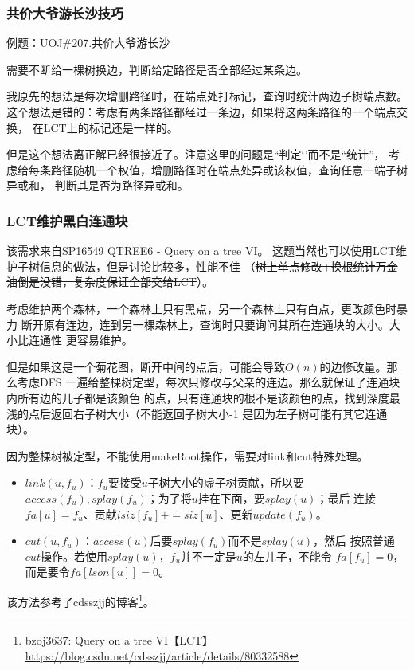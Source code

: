 \subsubsection{共价大爷游长沙技巧}
例题：UOJ\#207.共价大爷游长沙

需要不断给一棵树换边，判断给定路径是否全部经过某条边。

我原先的想法是每次增删路径时，在端点处打标记，查询时统计两边子树端点数。
这个想法是错的：考虑有两条路径都经过一条边，如果将这两条路径的一个端点交换，
在LCT上的标记还是一样的。

但是这个想法离正解已经很接近了。注意这里的问题是``判定‘'而不是``统计''，
考虑给每条路径随机一个权值，增删路径时在端点处异或该权值，查询任意一端子树异或和，
判断其是否为路径异或和。
\subsubsection{LCT维护黑白连通块}
该需求来自SP16549 QTREE6 - Query on a tree VI。
这题当然也可以使用LCT维护子树信息的做法，但是讨论比较多，性能不佳
（\sout{树上单点修改+换根统计万金油倒是没错，复杂度保证全部交给LCT}）。

考虑维护两个森林，一个森林上只有黑点，另一个森林上只有白点，更改颜色时暴力
断开原有连边，连到另一棵森林上，查询时只要询问其所在连通块的大小。大小比连通性
更容易维护。

但是如果这是一个菊花图，断开中间的点后，可能会导致$O(n)$的边修改量。那么考虑DFS
一遍给整棵树定型，每次只修改与父亲的连边。那么就保证了连通块内所有边的儿子都是该颜色
的点，只有连通块的根不是该颜色的点，找到深度最浅的点后返回右子树大小（不能返回子树大小-1
是因为左子树可能有其它连通块）。

因为整棵树被定型，不能使用makeRoot操作，需要对link和cut特殊处理。

\begin{itemize}
    \item $link(u,f_u)$：$f_u$要接受$u$子树大小的虚子树贡献，所以要
    $access(f_u),splay(f_u)$；为了将$u$挂在下面，要$splay(u)$；最后
    连接$fa[u]=f_u$、贡献$isiz[f_u]+=siz[u]$、更新$update(f_u)$。
    \item $cut(u,f_u)$：$access(u)$后要$splay(f_u)$而不是$splay(u)$，然后
    按照普通$cut$操作。若使用$splay(u)$，$f_u$并不一定是$u$的左儿子，不能令
    $fa[f_u]=0$，而是要令$fa[lson[u]]=0$。
\end{itemize}

该方法参考了cdsszjj的博客\footnote{
    bzoj3637: Query on a tree VI【LCT】\\
    \url{https://blog.csdn.net/cdsszjj/article/details/80332588}
}。
